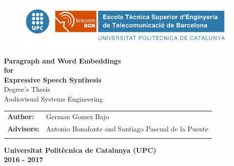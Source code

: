 \documentclass[11pt,a4paper]{report}
\author{German Gomez Bajo}
\begin{document}
\begin{titlepage}

	\begin{center}
		\begin{figure}[htb]
		\centering
			\includegraphics[width=1\textwidth]{figures/logo_upc.png}
		\end{figure}

		\vspace{1cm}


                \textbf{ \Huge Paragraph and Word Embeddings \\ \vspace{0.3cm} for \\ \vspace{0.5cm} Expressive Speech Synthesis} \\ %
		\vspace*{0.3in}
		\vspace*{0.1in}
		{\Large  Degree's Thesis \\Audiovisual Systems Engineering }\\
		\vspace{5cm}
		\begin{tabular}{ll}

			\large{\textbf{Author:}}	&
			\large{German Gomez Bajo} \\

			\large{\textbf{Advisors:}}	&
			\large{Antonio Bonafonte and Santiago Pascual de la Puente} \\	
			\vspace{1cm}
		\end{tabular}

		\large{\textbf{Universitat Politècnica de Catalunya (UPC)}}\\
		\large{\textbf{2016 - 2017}}\\
	\end{center}
\end{titlepage}
\end{document}
